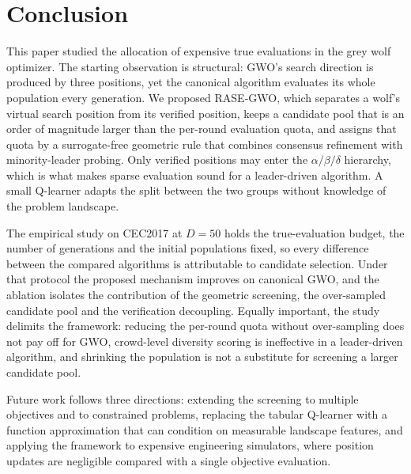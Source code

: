 \section{Conclusion}
\label{sec:conclusion}

This paper studied the allocation of expensive true evaluations in the grey wolf
optimizer. The starting observation is structural: GWO's search direction is
produced by three positions, yet the canonical algorithm evaluates its whole
population every generation. We proposed RASE-GWO, which separates a wolf's
virtual search position from its verified position, keeps a candidate pool that
is an order of magnitude larger than the per-round evaluation quota, and assigns
that quota by a surrogate-free geometric rule that combines consensus refinement
with minority-leader probing. Only verified positions may enter the
$\alpha/\beta/\delta$ hierarchy, which is what makes sparse evaluation sound for
a leader-driven algorithm. A small Q-learner adapts the split between the two
groups without knowledge of the problem landscape.

The empirical study on CEC2017 at $D=50$ holds the true-evaluation budget, the
number of generations and the initial populations fixed, so every difference
between the compared algorithms is attributable to candidate selection. Under
that protocol the proposed mechanism improves on canonical GWO, and the ablation
isolates the contribution of the geometric screening, the over-sampled candidate
pool and the verification decoupling. Equally important, the study delimits the
framework: reducing the per-round quota without over-sampling does not pay off
for GWO, crowd-level diversity scoring is ineffective in a leader-driven
algorithm, and shrinking the population is not a substitute for screening a
larger candidate pool.

Future work follows three directions: extending the screening to multiple
objectives and to constrained problems, replacing the tabular Q-learner with a
function approximation that can condition on measurable landscape features, and
applying the framework to expensive engineering simulators, where position
updates are negligible compared with a single objective evaluation.
